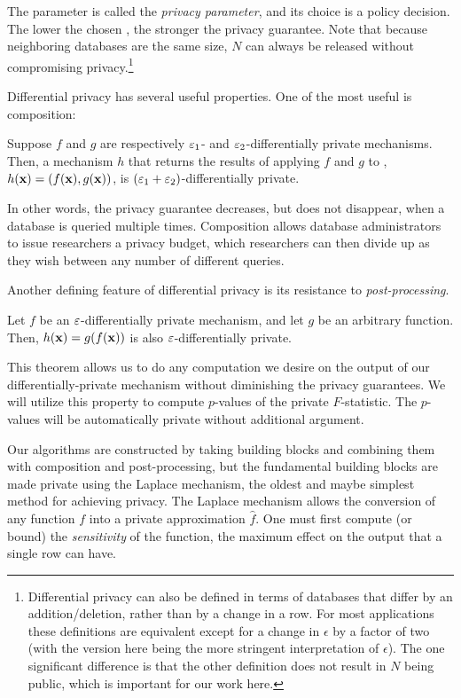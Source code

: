 The parameter \eps is called the \textit{privacy parameter}, and its choice is a policy decision. The lower the chosen \eps, the stronger the privacy guarantee. Note that because neighboring databases are the same size, $N$ can always be released without compromising privacy.\footnote{Differential privacy can also be defined in terms of databases that differ by an addition/deletion, rather than by a change in a row.  For most applications these definitions are equivalent except for a change in $\epsilon$ by a factor of two (with the version here being the more stringent interpretation of $\epsilon$). The one significant difference is that the other definition does not result in $N$ being public, which is important for our work here.}

Differential privacy has several useful properties.  One of the most useful is composition:

\begin{theorem}[Composition]\label{thm:composition} Suppose $f$ and $g$ are respectively $\varepsilon_{1}$- and $\varepsilon_{2}$-differentially private mechanisms. Then, a mechanism $h$ that returns the results of applying $f$ and $g$ to \x, $h(\mathbf{x}) = (f(\mathbf{x}), g(\mathbf{x}))$, is $(\varepsilon_{1} + \varepsilon_{2})$-differentially private.
\end{theorem}

In other words, the privacy guarantee decreases, but does not disappear, when a database is queried multiple times.  Composition allows database administrators to issue researchers a privacy budget, which researchers can then divide up as they wish between any number of different queries.

Another defining feature of differential privacy is its resistance to \textit{post-processing}.

\begin{theorem} \label{thm:postprocessing}
Let $f$ be an $\varepsilon$-differentially private mechanism, and let $g$ be an arbitrary function. Then, $h(\mathbf{x}) = g(f(\mathbf{x}))$ is also $\varepsilon$-differentially private.
\end{theorem}

This theorem allows us to do any computation we desire on the output of our differentially-private mechanism without diminishing the privacy guarantees. We will utilize this property to compute $p$-values of the private $F$-statistic.  The $p$-values will be automatically private without additional argument.

Our algorithms are constructed by taking building blocks and combining them with composition and post-processing, but the fundamental building blocks are made private using the Laplace mechanism, the oldest and maybe simplest method for achieving privacy.  The Laplace mechanism allows the conversion of any function $f$ into a private approximation $\hat{f}$. One must first compute (or bound) the \textit{sensitivity} of the function, the maximum effect on the output that a single row can have.

